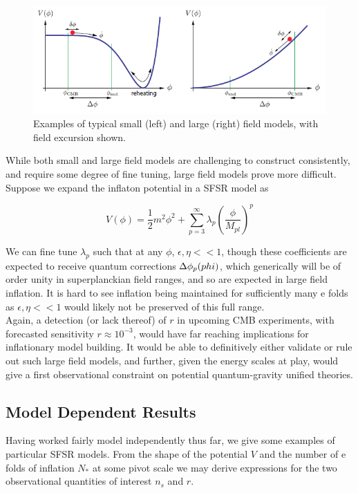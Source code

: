 \documentclass[a4paper,10pt]{article}
\newcommand{\Mp}{M_{pl}}
\newcommand{\half}{\frac{1}{2}}
\begin{document}
\begin{figure}[h]
  \includegraphics[width=\linewidth]{smalllargefield.png}
  \caption{Examples of typical small (left) and large (right) field models, with field excursion shown.}
\end{figure}

While both small and large field models are challenging to construct consistently, and require some degree of fine tuning, large field models prove more difficult. Suppose we expand the inflaton potential in a SFSR model as 

\begin{equation}
V(\phi) = \half m^2\phi^2 + \sum_{p=3}^\infty \lambda_p(\frac{\phi}{\Mp})^p
\end{equation}

We can fine tune $\lambda_p$ such that at any $\phi$, $\epsilon, \eta << 1$, though these coefficients are expected to receive quantum corrections $\Delta\phi_p(\\phi)$, which generically will be of order unity in superplanckian field ranges, and so are expected in large field inflation. It is hard to see inflation being maintained for sufficiently many e folds as $\epsilon, \eta << 1$ would likely not be preserved of this full range. \\

Again, a detection (or lack thereof) of $r$ in upcoming CMB experiments, with forecasted sensitivity $r\approx 10^{-3}$, would have far reaching implications for inflationary model building. It would be able to definitively either validate or rule out such large field models, and further, given the energy scales at play, would give a first observational constraint on potential quantum-gravity unified theories.

\subsection{Model Dependent Results}

Having worked fairly model independently thus far, we give some examples of particular SFSR models. From the shape of the potential $V$ and the number of e folds of inflation $N_*$ at some pivot scale we may derive expressions for the two observational quantities of interest $n_s$ and $r$. 
\end{document}
